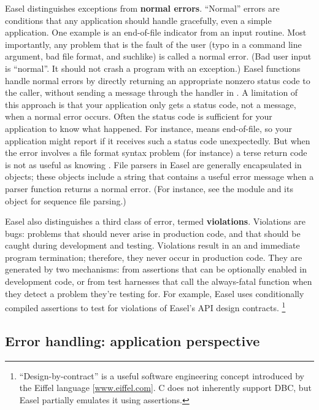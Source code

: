 Easel distinguishes exceptions from \textbf{normal errors}. ``Normal''
errors are conditions that any application should handle gracefully,
even a simple application. One example is an end-of-file indicator
from an input routine. Most importantly, any problem that is the fault
of the user (typo in a command line argument, bad file format, and
suchlike) is called a normal error. (Bad user input is ``normal''. It
should not crash a program with an exception.) Easel functions handle
normal errors by directly returning an appropriate nonzero status code
to the caller, without sending a message through the handler in
. A limitation of this approach is that your
application only gets a status code, not a message, when a normal
error occurs. Often the status code is sufficient for your application
to know what happened. For instance,  means end-of-file,
so your application might report  if it
receives such a status code unexpectedly. But when the error involves
a file format syntax problem (for instance) a terse 
return code is not as useful as knowing . File parsers in
Easel are generally encapsulated in objects; these objects include a
 string that contains a useful error message when a
parser function returns a normal error. (For instance, see the
 module and its  object for sequence
file parsing.)

Easel also distinguishes a third class of error, termed
\textbf{violations}. Violations are bugs: problems that should never
arise in production code, and that should be caught during development
and testing. Violations result in an  and immediate
program termination; therefore, they never occur in production
code. They are generated by two mechanisms: from assertions that can
be optionally enabled in development code, or from test harnesses that
call the always-fatal  function when they detect a
problem they're testing for. For example, Easel uses conditionally
compiled assertions to test for violations of Easel's API design
contracts. \footnote{``Design-by-contract'' is a useful software
engineering concept introduced by the Eiffel language
[\url{www.eiffel.com}]. C does not inherently support DBC, but Easel
partially emulates it using assertions.}

\subsection{Error handling: application perspective}

